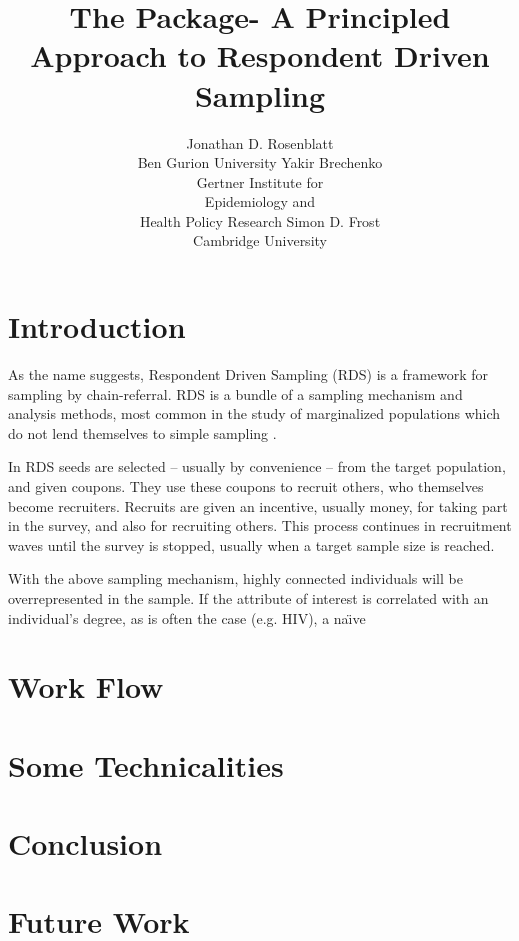 \documentclass[article]{jss}
\author{Jonathan D. Rosenblatt\\Ben Gurion University \And 
        Yakir Brechenko\\ Gertner Institute for \\ Epidemiology and \\ Health Policy Research \And
        Simon D. Frost\\ Cambridge University}
\title{The \pkg{chords} \proglang{R} Package- A Principled Approach to Respondent Driven Sampling}
\newcommand{\naive}{na\"{\i}ve}
\begin{document}

\section{Introduction}

As the name suggests, Respondent Driven Sampling (RDS) is a framework for sampling by chain-referral.
RDS is a bundle of a sampling mechanism and analysis methods, most common in the study of marginalized populations which do not lend themselves to simple sampling \cite{heckathorn_respondent-driven_1997,heckathorn_respondent-driven_2002}. 

In RDS seeds are selected -- usually by convenience -- from the target population, and given coupons. 
They use these coupons to recruit others, who themselves become recruiters. 
Recruits are given an incentive, usually money, for taking part in the survey, and also for recruiting others.
This process continues in recruitment waves until the survey is stopped, usually when a target sample size is reached.

With the above sampling mechanism, highly connected individuals will be overrepresented in the sample.
If the attribute of interest is correlated with an individual's degree, as is often the case (e.g. HIV), a \naive

\section{Work Flow}


\section{Some Technicalities}


\section{Conclusion}


\section{Future Work}




\end{document}
